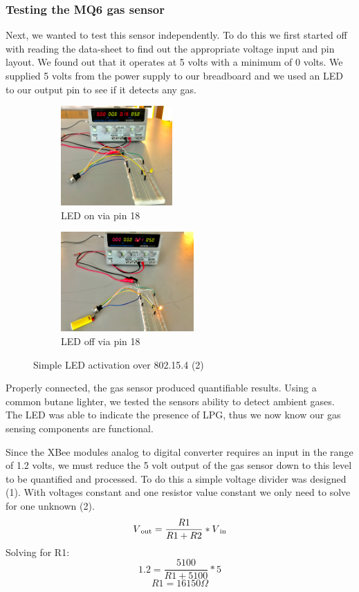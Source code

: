 \subsubsection{Testing the MQ6 gas sensor}
\par Next, we wanted to test this sensor independently. To do this we first started off with reading the data-sheet to find out the appropriate voltage input and pin layout. We found out that it operates at 5 volts with a minimum of 0 volts. We supplied 5 volts from the power supply to our breadboard and we used an LED to our output pin to see if it detects any gas. 
\begin{figure}[h!]
	\centering
	\begin{subfigure}[t]{0.45\textwidth}
		\centering
		\includegraphics[height=1.5in]{mq6Test.png}
		\caption{LED on via pin 18}
	\end{subfigure}
	\begin{subfigure}[t]{0.45\textwidth}
		\centering
		\includegraphics[height=1.5in]{mq6TestOn.png}
		\caption{LED off via pin 18}
	\end{subfigure}
	\caption{Simple LED activation over 802.15.4 (2)}
\end{figure}
\par Properly connected, the gas sensor produced quantifiable results. Using a common butane lighter, we tested the sensors ability to detect ambient gases. The LED was able to indicate the presence of LPG, thus we now know our gas sensing components are functional.
\par Since the XBee modules analog to digital converter requires an input in the range of 1.2 volts, we must reduce the 5 volt output of the gas sensor down to this level to be quantified and processed. To do this a simple voltage divider was designed (1). With voltages constant and one resistor value constant we only need to solve for one unknown (2).
\begin{equation}
V\textsubscript{out}=\frac{R1}{R1+R2}*V\textsubscript{in}
\end{equation}
Solving for R1: \\
\begin{equation}
1.2 = \frac{5100}{R1+5100}*5
\end{equation}
\[R1 = 16150 \Omega\]

